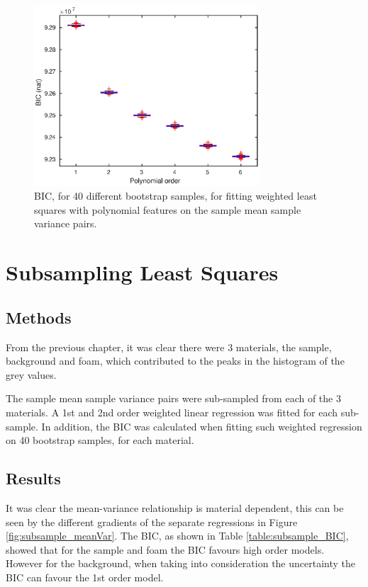\documentclass[12pt]{report}
\begin{document}
\begin{figure}
	\centering
	\includegraphics[width=0.75\textwidth]{figures/meanVar/polynomialBIC.eps}
	\caption{BIC, for 40 different bootstrap samples, for fitting weighted least squares with polynomial features on the sample mean sample variance pairs.}
	\label{fig:weightedLS_BIC}
\end{figure}

\section{Subsampling Least Squares}
\subsection{Methods}
From the previous chapter, it was clear there were 3 materials, the sample, background and foam, which contributed to the peaks in the histogram of the grey values.

The sample mean sample variance pairs were sub-sampled from each of the 3 materials. A 1st and 2nd order weighted linear regression was fitted for each sub-sample. In addition, the BIC was calculated when fitting such weighted regression on 40 bootstrap samples, for each material.

\subsection{Results}

It was clear the mean-variance relationship is material dependent, this can be seen by the different gradients of the separate regressions in Figure \ref{fig:subsample_meanVar}. The BIC, as shown in Table \ref{table:subsample_BIC}, showed that for the sample and foam the BIC favours high order models. However for the background, when taking into consideration the uncertainty the BIC can favour the 1st order model.
\end{document}
